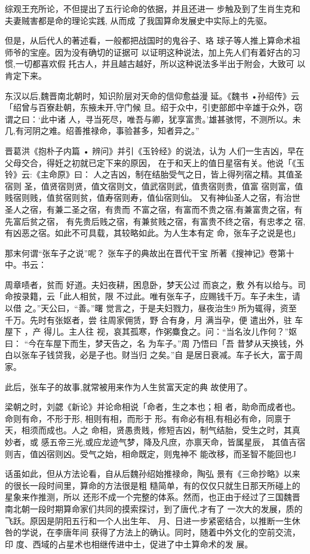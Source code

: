 综观王充所论，不但提出了五行论命的依据，并且还进一
步触及到了生肖生克和夫妻贼害都是命的理论实践, 从而成
了我国算命发展史中实际上的先驱。

但是，从后代人的著述看，一般都把战国时的鬼谷子、珞
球子等人推上算命术祖师爷的宝座。因为没有确切的证据可
以证明这种说法，加上先人们有着好古的习惯,一切都喜欢假
托古人，并且越古越好，所以这种说法多半出于附会，大致可
以肯定下来。

东汉以后,魏晋南北朝时，知识阶层对天命的信仰愈益漫
延。《魏书 •孙绍传》云「绍曾与百寮赴朝，东掖未开,守门候
旦。绍于众中，引吏部郎中辛雄于众外，窃谓之曰：‘此中诸
人，寻当死尽，唯吾与卿，犹享富贵。'雄甚骇愕，不测所以。未
几,有河阴之难。绍善推禄命，事验甚多，知者异之。”

晋葛洪《抱朴子内篇 • 辨问》并引《玉铃经》的说法，认为
人们一生吉凶，早在父母交合，得妊之初就已定下来的原因，
在于和天上的值日星宿有关。他说「《玉铃》云:《主命原》曰：
人之吉凶，制在结胎受气之日，皆上得列宿之精。其值圣宿则
圣，值贤宿则贤，值文宿则文，值武宿则武，值贵宿则贵，值富
宿则富，值贱宿则贱，值贫宿则贫，值寿宿则寿，值仙宿则仙。
又有神仙圣人之宿，有治世圣人之宿，有兼二圣之宿，有贵而
不富之宿，有富而不贵之宿,有兼富贵之宿，有先富后贫之宿，
有先贵后贱之宿，有兼贫贱之宿，有富贵不终之宿，有忠孝之
宿,有凶恶之宿。如此不可具载，其较略如此。为人生本有定
命，张车子之说是也」

那末何谓“张车子之说”呢？ 张车子的典故出在晋代干宝
所著《搜神记》卷第十中。书云：

周章啧者，贫而 好道。夫妇夜耕，困息卧，梦天公过
而哀之，敷 外有以给与。司命按录籍，云「此人相贫，限
不过此。唯有张车子，应赐钱千万。车子未生，请以借
之。”天公曰，“善。”曙 觉言之，于是夫妇戮力，昼夜治生9
所为辄得，资至 千万。先时有张妪者，尝 往周家佣赁，野
合有身，月 满当孕，便 遣出外，驻 车屋下 ，产 得儿。主人往
视，哀其孤寒，作粥麋食之。问：“当名汝儿作何？”妪曰：
“今在车屋下而生，梦天告之，名 为车子。”周 乃悟曰「吾
昔梦从天换钱，外白以张车子钱贷我，必是子也。财当归
之矣。”自 是居日衰减。车子长大，富于周家。

此后，张车子的故事,就常被用来作为人生贫富天定的典
故使用了。

梁朝之时，刘勰《新论》并论命相说「命者，生之本也；相
者，助命而成者也。命则有命，不形于形, 相则有相，而形于
形。有命必有相,有相必有命，同禀于天，相须而成也。人之
命相，贤愚贵贱，修短吉凶，制气结胎，受生之时，其真妙者，或
感五帝三光,或应龙迹气梦，降及凡庶，亦禀天命，皆属星辰，
其值吉宿则吉，值凶宿则凶。受气之始，相命既定，则鬼神不
能改移，而圣智不能回也J

话虽如此，但从方法论看，自从后魏孙绍始推禄命，陶弘
景有《三命抄略》以来的很长一段时间里，算命的方法很是粗
糙简单，有的仅仅只就生日那天所碰上的星象来作推测，所以
还形不成一个完整的体系。然而，也正由于经过了三国魏晋
南北朝一段时期算命家们共同的摸索探讨，到了唐代,才有了
一次大的发展，质的 飞跃。原因是阴阳五行和一个人出生年、
月、日进一步紧密结合，以推断一生休咎的学说，在李唐年间
获得了方法上的确认。同时，随着中外文化的空前交流，印
度、西域的占星术也相继传进中土，促进了中土算命术的发
展。

